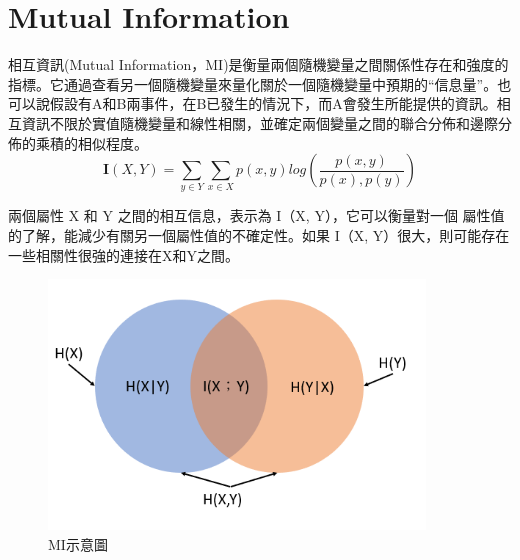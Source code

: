 \chapter{Mutual Information}
\label{chapter:intro}
相互資訊(Mutual Information，MI)是衡量兩個隨機變量之間關係性存在和強度的指標。它通過查看另一個隨機變量來量化關於一個隨機變量中預期的“信息量”。也可以說假設有A和B兩事件，在B已發生的情況下，而A會發生所能提供的資訊。相互資訊不限於實值隨機變量和線性相關，並確定兩個變量之間的聯合分佈和邊際分佈的乘積的相似程度。
\begin{equation}
\label{eqn:MI}
    \textbf{I}(X,Y)=\sum_{y\in Y}^{}\sum_{x\in X}^{}p(x,y)log(\frac{p(x,y)}{p(x),p(y)})
\end{equation}

        兩個屬性 X 和 Y 之間的相互信息，表示為 I（X, Y），它可以衡量對一個 屬性值的了解，能減少有關另一個屬性值的不確定性。如果 I（X, Y）很大，則可能存在一些相關性很強的連接在X和Y之間。

        \begin{figure}[h]
            \centering
            \includegraphics[width=10cm]{./pic/MI.PNG}
            \caption{MI示意圖}
            \label{fig:MI}
        \end{figure}

